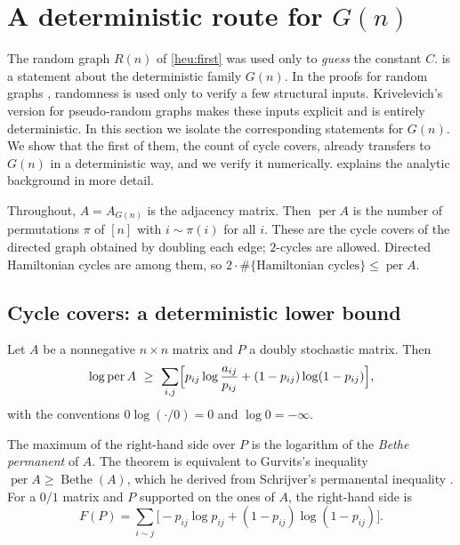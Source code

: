 \section{A deterministic route for $G(n)$}\label{sec:deterministic}

The random graph $R(n)$ of \cref{heu:first} was used only to \emph{guess} the constant
$C$.  is a statement about the deterministic family $G(n)$. In the
proofs for random graphs \cite{GlebovKrivelevich}, randomness is used only to verify a
few structural inputs. Krivelevich's version for pseudo-random graphs \cite{Krivelevich}
makes these inputs explicit and is entirely deterministic. In this section we isolate the
corresponding statements for $G(n)$. We show that the first of them, the count of cycle
covers, already transfers to $G(n)$ in a deterministic way, and we verify it numerically.
 explains the analytic background in more detail.

Throughout, $A=A_{G(n)}$ is the adjacency matrix. Then $\operatorname{per}A$ is the number
of permutations $\pi$ of $[n]$ with $i\sim\pi(i)$ for all $i$. These are the cycle covers
of the directed graph obtained by doubling each edge; $2$-cycles are allowed.
Directed Hamiltonian cycles are among them, so $2\cdot\#\{\text{Hamiltonian cycles}\}\le\operatorname{per}A$.

\subsection{Cycle covers: a deterministic lower bound}

\begin{theorem}\label{thm:GS}
Let $A$ be a nonnegative $n\times n$ matrix and $P$ a doubly stochastic matrix. Then
\[
\log\operatorname{per}A\ \ge\ \sum_{i,j}\Bigl[p_{ij}\log\frac{a_{ij}}{p_{ij}}+(1-p_{ij})\log(1-p_{ij})\Bigr],
\]
with the conventions $0\log(\cdot/0)=0$ and $\log 0=-\infty$.
\end{theorem}

The maximum of the right-hand side over $P$ is the logarithm of the \emph{Bethe
permanent} of $A$. The theorem is equivalent to Gurvits's inequality
$\operatorname{per}A\ge\operatorname{Bethe}(A)$, which he derived from Schrijver's
permanental inequality \cite{Schrijver}. For a $0/1$ matrix and $P$ supported on the ones
of $A$, the right-hand side is
\[
F(P)=\sum_{i\sim j}\bigl[-p_{ij}\log p_{ij}+(1-p_{ij})\log(1-p_{ij})\bigr].
\]

